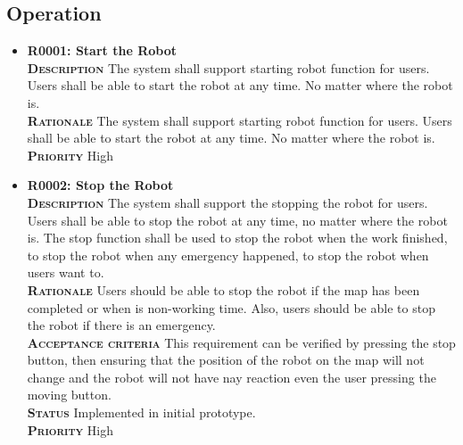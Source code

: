\documentclass[11pt, a4paper]{article}
\begin{document}
\subsection{Operation}
\begin{itemize}
\item {\bfseries R0001: Start the Robot}\\
\textsc{\bfseries Description} The system shall support starting robot function for users. Users shall be able to start the robot at any time. No matter where the robot is.\\
\textsc{\bfseries Rationale} The system shall support starting robot function for users. Users shall be able to start the robot at any time. No matter where the robot is.\\
\textsc{\bfseries Priority} High\\

\item {\bfseries R0002: Stop the Robot}\\
\textsc{\bfseries Description} The system shall support the stopping the robot for users. Users shall be able to stop the robot at any time, no matter where the robot is. The stop function shall be used to stop the robot when the work finished, to stop the robot when any emergency happened, to stop the robot when users want to.\\
\textsc{\bfseries Rationale} Users should be able to stop the robot if the map has been completed or when is non-working time. Also, users should be able to stop the robot if there is an emergency.\\
\textsc{\bfseries Acceptance criteria} This requirement can be verified by pressing the stop button, then ensuring that the position of the robot on the map will not change and the robot will not have nay reaction even the user pressing the moving button.\\
\textsc{\bfseries Status} Implemented in initial prototype.\\
\textsc{\bfseries Priority} High\\


\end{itemize}
\end{document}
